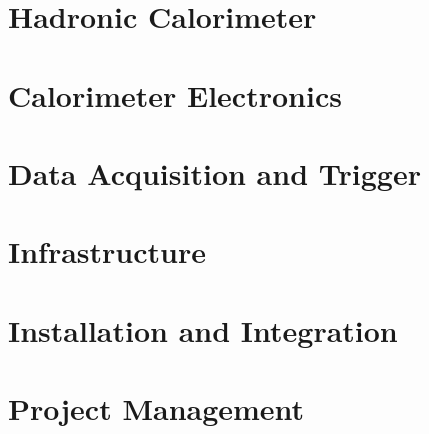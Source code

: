 \documentclass[12pt,twoside,notitlepage]{book}
\begin{document}
\chapter{Hadronic Calorimeter}
\label{hcal}

 
\chapter{Calorimeter Electronics}
\label{cal_electronics}


 
\chapter{Data Acquisition and Trigger}
\label{daq_trig}

 
\chapter{Infrastructure}
\label{infrastruct}

 
\chapter{Installation and Integration}
\label{install_integ}

 
\chapter{Project Management}
\label{proj_mgmt}

 
\end{document}

